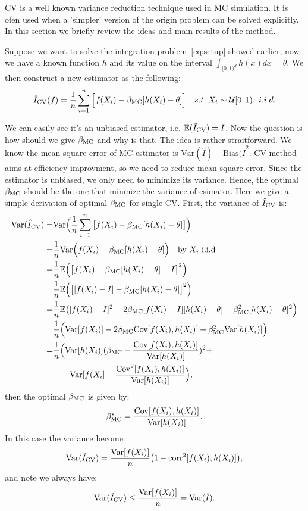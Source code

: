 
CV is a well known variance reduction technique used in MC simulation. 
It is ofen used when a 'simpler' version of the origin problem can be solved explicitly. In this section we briefly review the ideas and main results of the method.
 
Suppose we want to solve the integration problem~\eqref{eq:setup} showed earlier, now we have a known function $h$ and its value on the interval
$\int_{[0,1)^d} h(x)dx = \theta$. 
We then construct a new estimator as the following:
\[\hat{I}_{\mathrm{CV}}(f)=\frac{1}{n}\sum_{i=1}^{n}\Big[ f(X_i)-\beta_{\mathrm{MC}}[h(X_i)-\theta] \Big] \quad s.t.\; X_i\sim \mathcal{U}[0,1), \; i.i.d.\]

We can easily see it's an unbiased estimator, i.e. $\mathbb{E}(\hat{I}_{\mathrm{CV}}) = I$.
Now the question is how should we give $\beta_{\mathrm{MC}}$ and why is that.
The idea is rather straitforward. 
We know the mean square error of MC estimator is $\mathrm{Var}(\hat{I})+\mathrm{Bias}(\hat{I}^2$\cite{}. 
CV method aims at efficiency improvment, so we need to reduce mean square error. 
Since the estimator is unbiased, we only need to minimize its variance.
Hence, the optimal $\beta_{\mathrm{MC}}$ should be the one that minmize the variance of esimator.
Here we give a simple derivation of optimal $\beta_{\mathrm{MC}}$ for single CV.
First, the variance of $\hat{I}_{\mathrm{CV}}$ is: 
\begin{align*}
	\mathrm{Var}(\hat{I}_{\mathrm{CV}})
    =&\mathrm{Var}\Big( \frac{1}{n}\sum_{i=1}^{n}\big[ f(X_i)-\beta_{\mathrm{MC}}[h(X_i)-\theta] \big]\Big)\\
    =&\frac{1}{n}\mathrm{Var}\Big(f(X_i)-\beta_{\mathrm{MC}}[h(X_i)-\theta]\Big)\quad \text{by $X_i$ i.i.d} \\
    =&\frac{1}{n}\mathbb{E}\Big(\big[f(X_i)-\beta_{\mathrm{MC}}[h(X_i)-\theta]-I\big]^2 \Big) \\
    =&\frac{1}{n}\mathbb{E}\Big(\big[ [f(X_i)-I] -\beta_{\mathrm{MC}}[h(X_i)-\theta]\big]^2 \Big) \\
    =&\frac{1}{n}\mathbb{E}\big([f(X_i)-I]^2-2\beta_{\mathrm{MC}}[f(X_i)-I][h(X_i)-\theta]+\beta_{\mathrm{MC}}^2[h(X_i)-\theta]^2 \Big)\\
    =&\frac{1}{n}\Big(\mathrm{Var}[f(X_i)]-2\beta_{\mathrm{MC}}\mathrm{Cov}[f(X_i),h(X_i)]+\beta_{\mathrm{MC}}^2\mathrm{Var}[h(X_i)]\Big)\\
    =&\frac{1}{n}\Big(\mathrm{Var}[h(X_i)](\beta_{\mathrm{MC}}-\frac{\mathrm{Cov}[f(X_i),h(X_i)]}{\mathrm{Var}[h(X_i)]})^2+\\
    &\quad \quad \mathrm{Var}[f(X_i]-\frac{\mathrm{Cov}^2[f(X_i),h(X_i)]}{\mathrm{Var}[h(X_i)]} \Big),
\end{align*}
then the optimal $\beta_{\mathrm{MC}}$ is given by: 
\begin{equation}
    \beta_{\mathrm{MC}}^*=\frac{\mathrm{Cov}[f(X_i),h(X_i)]}{\mathrm{Var}[h(X_i)]}.
    \label{eq:optBeta}
\end{equation}
In this case the variance become:
\[
    \mathrm{Var}(\hat{I}_{\mathrm{CV}})= \frac{\mathrm{Var}[f(X_i)]}{n}\big(1-\mathrm{corr}^2[f(X_i), h(X_i)]\big),
\]
and note we always have: 
\[
\mathrm{Var}(\hat{I}_{\mathrm{CV}}) \leq \frac{\mathrm{Var}[f(X_i)]}{n}=\mathrm{Var}(\hat{I}).
\]

